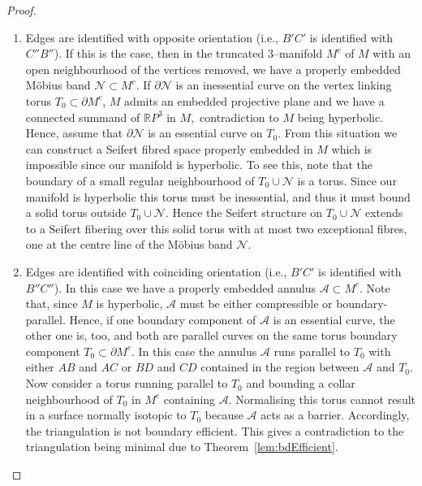 \documentclass[a4paper]{gtart}
\def\manifold{M}
\def\core{M^c}
\def\R{\mathbb{R}}
\theoremstyle{plain}
\theoremstyle{definition}
\theoremstyle{remark}
\numberwithin{equation}{section}
\begin{document}
\begin{proof}
\begin{enumerate}
  \item Edges are identified with opposite orientation (i.e., $B'C'$ is identified with $C''B''$). If this is the case, then in the truncated 3--manifold $\core$ of $\manifold$ with an open neighbourhood of the vertices removed, we have a properly embedded M\"{o}bius band $\mathcal{N} \subset \core.$ If $\partial \mathcal{N}$ is an inessential curve on the vertex linking torus $T_0 \subset \partial \core$, $\manifold$ admits an embedded projective plane and we have a connected summand of $\R P^3$ in $\manifold,$ contradiction to $\manifold$ being hyperbolic. Hence, assume that $\partial \mathcal{N}$ is an essential curve on $T_0$. From this situation we can construct a Seifert fibred space properly embedded in $\manifold$ which is impossible since our manifold is hyperbolic. To see this, note that the boundary of a small regular neighbourhood of $T_0 \cup  \mathcal{N}$ is a torus. Since our manifold is hyperbolic this torus must be inessential, and thus it must bound a solid torus outside $T_0 \cup  \mathcal{N}.$ Hence the Seifert structure on $T_0 \cup  \mathcal{N}$ extends to a Seifert fibering over this solid torus with at most two exceptional fibres, one at the centre line of the M\"{o}bius band $\mathcal{N}.$ 
  \item Edges are identified with coinciding orientation (i.e., $B'C'$ is identified with $B''C''$). In this case we have a properly embedded annulus $\mathcal{A} \subset  \core.$ Note that, since $\manifold$ is hyperbolic, $\mathcal{A}$ must be either compressible or boundary-parallel. Hence, if one boundary component of $\mathcal{A}$ is an essential curve, the other one is, too, and both are parallel curves on the same torus boundary component $T_0 \subset \partial \core .$ In this case the annulus $\mathcal{A}$ runs parallel to $T_0$ with either $AB$ and $AC$ or $BD$ and $CD$ contained in the region between $\mathcal{A}$ and $T_0$. Now consider a torus running parallel to $T_0$ and bounding a collar neighbourhood of $T_0$ in $\core$ containing $\mathcal{A}$. Normalising this torus cannot result in a surface normally isotopic to $T_0$ because $\mathcal{A}$ acts as a barrier. Accordingly, the triangulation is not boundary efficient. This gives a contradiction to the triangulation being minimal due to Theorem~\ref{lem:bdEfficient}. 


\end{enumerate}
\end{proof}
\end{document}
